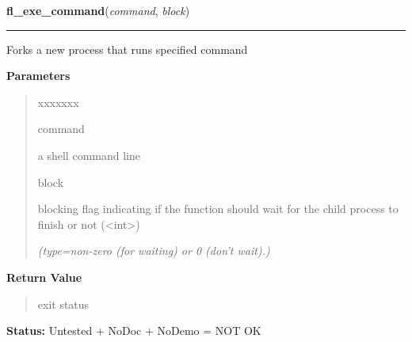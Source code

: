 \hspace{.8\funcindent}\begin{boxedminipage}{\funcwidth}

    \raggedright \textbf{fl\_exe\_command}(\textit{command}, \textit{block})

    \vspace{-1.5ex}

    \rule{\textwidth}{0.5\fboxrule}
\setlength{\parskip}{2ex}
    Forks a new process that runs specified command

\setlength{\parskip}{1ex}
      \textbf{Parameters}
      \vspace{-1ex}

      \begin{quote}
        \begin{Ventry}{xxxxxxx}

          \item[command]

          a shell command line

          \item[block]

          blocking flag indicating if the function should wait for the 
          child process to finish or not ({\textless}int{\textgreater})

            {\it (type=non-zero (for waiting) or 0 (don't wait).)}

        \end{Ventry}

      \end{quote}

      \textbf{Return Value}
    \vspace{-1ex}

      \begin{quote}
      exit status

      \end{quote}

\textbf{Status:} Untested + NoDoc + NoDemo = NOT OK



    \end{boxedminipage}

    \label{xformslib:flgoodies:fl_exe_command}

    \vspace{0.5ex}

